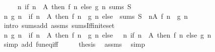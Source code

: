 \begin{isabellebody}
\ \ \ \ \ {\isachardoublequoteopen}{\isacharparenleft}{\kern0pt}{\isasymlambda}n{\isachardot}{\kern0pt}\ if\ n\ {\isasymin}\ A\ then\ f\ n\ else\ g\ n{\isacharparenright}{\kern0pt}\ sums\ S{\isacharprime}{\kern0pt}{\isachardoublequoteclose}\isanewline
%
\isadelimproof
%
\endisadelimproof
%
\isatagproof
{}\isamarkupfalse%
\ {\isacharminus}{\kern0pt}\isanewline
\ \ \isamarkupfalse%
\ {\isachardoublequoteopen}{\isacharparenleft}{\kern0pt}{\isasymlambda}n{\isachardot}{\kern0pt}\ g\ n\ {\isacharplus}{\kern0pt}\ {\isacharparenleft}{\kern0pt}if\ n\ {\isasymin}\ A\ then\ f\ n\ {\isacharminus}{\kern0pt}\ g\ n\ else\ {}{\isacharparenright}{\kern0pt}{\isacharparenright}{\kern0pt}\ sums\ {\isacharparenleft}{\kern0pt}S\ {\isacharplus}{\kern0pt}\ {\isacharparenleft}{\kern0pt}{\isasymSum}n{\isasymin}A{\isachardot}{\kern0pt}\ f\ n\ {\isacharminus}{\kern0pt}\ g\ n{\isacharparenright}{\kern0pt}{\isacharparenright}{\kern0pt}{\isachardoublequoteclose}\isanewline
\ \ \ \ \isamarkupfalse%
\ {\isacharparenleft}{\kern0pt}intro\ sums{\isacharunderscore}{\kern0pt}add\ assms\ sums{\isacharunderscore}{\kern0pt}If{\isacharunderscore}{\kern0pt}finite{\isacharunderscore}{\kern0pt}set{\isacharparenright}{\kern0pt}\isanewline
\ \ \isamarkupfalse%
\ \isamarkupfalse%
\ {\isachardoublequoteopen}{\isacharparenleft}{\kern0pt}{\isasymlambda}n{\isachardot}{\kern0pt}\ g\ n\ {\isacharplus}{\kern0pt}\ {\isacharparenleft}{\kern0pt}if\ n\ {\isasymin}\ A\ then\ f\ n\ {\isacharminus}{\kern0pt}\ g\ n\ else\ {}{\isacharparenright}{\kern0pt}{\isacharparenright}{\kern0pt}\ {\isacharequal}{\kern0pt}\ {\isacharparenleft}{\kern0pt}{\isasymlambda}n{\isachardot}{\kern0pt}\ if\ n\ {\isasymin}\ A\ then\ f\ n\ else\ g\ n{\isacharparenright}{\kern0pt}{\isachardoublequoteclose}\isanewline
\ \ \ \ \isamarkupfalse%
\ {\isacharparenleft}{\kern0pt}simp\ add{\isacharcolon}{\kern0pt}\ fun{\isacharunderscore}{\kern0pt}eq{\isacharunderscore}{\kern0pt}iff{\isacharparenright}{\kern0pt}\isanewline
\ \ \isamarkupfalse%
\ \isamarkupfalse%
\ {\isacharquery}{\kern0pt}thesis\ \isamarkupfalse%
\ assms\ \isamarkupfalse%
\ simp\isanewline
{}\isamarkupfalse%
%
\endisatagproof
{\isafoldproof}%
%
\isadelimproof
%
\endisadelimproof
%
\isadelimdocument
%
\endisadelimdocument
%
\isatagdocument
%
\isamarkuptrue%
%
\endisatagdocument
{\isafolddocument}%

\end{isabellebody}
